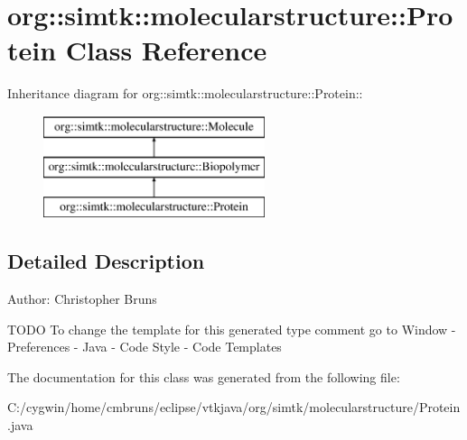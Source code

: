 \section{org::simtk::molecularstructure::Protein Class Reference}
\label{classorg_1_1simtk_1_1molecularstructure_1_1_protein}
Inheritance diagram for org::simtk::molecularstructure::Protein::\begin{figure}[H]
\begin{center}
\leavevmode
\includegraphics[height=3cm]{classorg_1_1simtk_1_1molecularstructure_1_1_protein}
\end{center}
\end{figure}


\subsection{Detailed Description}
\begin{Desc}
\item[Author:]Christopher Bruns\end{Desc}
TODO To change the template for this generated type comment go to Window - Preferences - Java - Code Style - Code Templates 



The documentation for this class was generated from the following file:\begin{CompactItemize}
\item 
C:/cygwin/home/cmbruns/eclipse/vtkjava/org/simtk/molecularstructure/Protein.java\end{CompactItemize}
